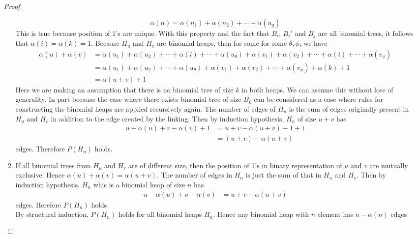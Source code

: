 \documentclass[11pt]{article}
\begin{document}
\begin{enumerate}
\begin{proof}
\begin{enumerate}
      \[
        \alpha(n) = \alpha(n_1) + \alpha(n_2) + \cdots + \alpha(n_q)
      \]
      This is true because position of $1$'s are unique. With this property and the fact that $B_i$, $B_i'$ and $B_j$ are all binomial trees, it follows that $\alpha(i) =\alpha(k) = 1$. Because $H_u$ and $H_v$ are binomial heaps, then for some for some $\theta, \phi$, we have
      \begin{align*}
          \alpha(u) + \alpha(v) &= \alpha(u_1) + \alpha(u_2) + \cdots +\alpha(i) + \cdots + \alpha(u_{\theta}) + \alpha(v_1) + \alpha(v_2) + \cdots +\alpha(i) + \cdots + \alpha(v_{\phi}) \\
          &= \alpha(u_1) + \alpha(u_2) + \cdots + \alpha(u_{\theta}) + \alpha(v_1) + \alpha(v_2) + \cdots + \alpha(v_{\phi}) + \alpha(k) + 1 \\
          &=\alpha(u+v) + 1 \tag{two $B_i$ merged into a single $B_k$}
      \end{align*}
      Here we are making an assumption that there is no binomial tree of size $k$ in both heaps. We can assume this without lose of generality. In part because the case where there exists binomial tree of size $B_k$ can be considered as a case where rules for constructing the binomial heaps are applied recursively again. The number of edges of $H_n$ is the sum of edges originally present in $H_u$ and $H_v$ in addition to the edge created by the linking. Then by induction hypothesis, $H_n$ of size $u+v$ has
      \begin{align*}
         u-\alpha(u) + v -\alpha(v) + 1 &= u + v -\alpha(u+v) -1 + 1\\
         &= (u+v) - \alpha(u+v)
      \end{align*}
      edges. Therefore $P(H_n)$ holds.
      \item If all binomial trees from $H_u$ and $H_v$ are of different size, then the position of 1's in binary representation of $u$ and $v$ are mutually exclusive. Hence $\alpha(u) + \alpha(v) = \alpha(u+v)$. The number of edges in $H_n$ is just the sum of that in $H_u$ and $H_v$. Then by induction hypothesis, $H_n$ whis is a binomial heap of size $n$ has
      \begin{align*}
        u-\alpha(u) + v -\alpha(v) &= u+v - \alpha(u+v)
      \end{align*}
      edges. Herefore $P(H_n)$ holds\\
      By structural induction, $P(H_n)$ holds for all binomial heaps $H_n$. Hence any binomial heap with $n$ element has $n-\alpha(n)$ edges


\end{enumerate}
\end{proof}
\end{enumerate}
\end{document}
